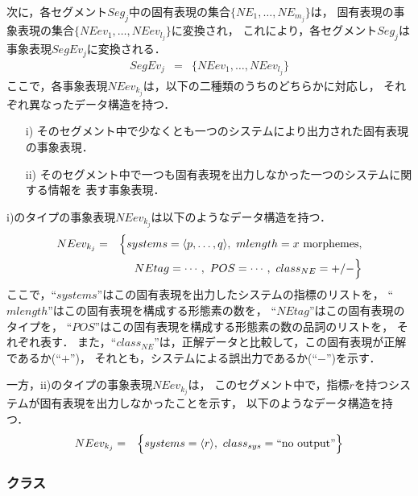 次に，各セグメント$Seg_j$中の固有表現の集合$\{ NE_1,\ldots,NE_{m_j} \}$は，
固有表現の事象表現の集合$\{ NEev_1,\ldots,NEev_{l_j} \}$に変換され，
これにより，各セグメント$Seg_j$は事象表現$SegEv_j$に変換される．
\begin{eqnarray}
 SegEv_j & = & \{ NEev_1,\ldots,NEev_{l_j} \}  \label{eqn:segev}
\end{eqnarray}
ここで，各事象表現$NEev_{k_j}$は，以下の二種類のうちのどちらかに対応し，
それぞれ異なったデータ構造を持つ．
\begin{enumerate}
\item[i)] そのセグメント中で少なくとも一つのシステムにより出力された固有表現の事象表現．
\item[ii)] そのセグメント中で一つも固有表現を出力しなかった一つのシステムに関する情報を
	表す事象表現．
\end{enumerate}
i)のタイプの事象表現$NEev_{k_j}$は以下のようなデータ構造を持つ．
\begin{eqnarray}
NEev_{k_j} & = &	\Bigl\{
	 systems =
	 \langle p,\ldots,q\rangle,\nonumber  
\ mlength = x\mbox{ morphemes},\nonumber \\
& &	 \ \  NEtag = \cdots,\ 
  		 POS = \cdots,\nonumber 
\ class_{NE} = +/-
	 \Bigr\} \label{eqn:NEnon-emp}
\end{eqnarray}
ここで，``$systems$''はこの固有表現を出力したシステムの指標のリストを，
``$mlength$''はこの固有表現を構成する形態素の数を，
``$NEtag$''はこの固有表現のタイプを，
``$POS$''はこの固有表現を構成する形態素の数の品詞のリストを，
それぞれ表す．
また，``$class_{NE}$''は，正解データと比較して，この固有表現が正解であるか(``$+$'')，
それとも，システムによる誤出力であるか(``$-$'')を示す．

一方，ii)のタイプの事象表現$NEev_{k_j}$は，
このセグメント中で，指標$r$を持つシステムが固有表現を出力しなかったことを示す，
以下のようなデータ構造を持つ．
\begin{eqnarray}
NEev_{k_j} & = &   	
       \Bigl\{
	 systems =
	 \langle r\rangle,  
\  class_{sys} =
	 \mbox{``no output''}
	 \Bigr\} \label{eqn:NEemp}
\end{eqnarray}

\subsubsection{クラス}
\label{subsubsec:class}

